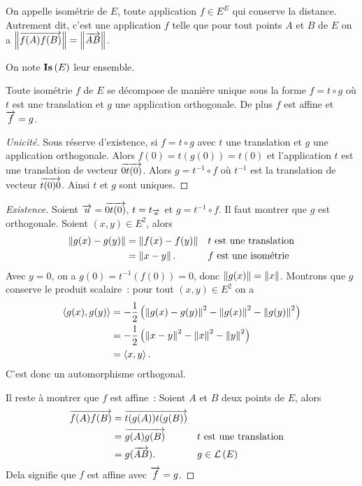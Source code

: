 \begin{defdef}
  On appelle isométrie de $E$, toute application $f \in E^E$ qui conserve la distance. Autrement dit, c'est une application $f$ telle que pour tout points $A$ et $B$ de $E$ on a $\left\lVert\overrightarrow{f(A)f(B)}\right\rVert=\left\lVert\overrightarrow{AB}\right\rVert$. 

  On note $\mathbf{Is}\left(E\right)$ leur ensemble.
\end{defdef}
%
\begin{theo}
\label{theo:isometrietransorth}
 Toute isométrie $f$ de $E$ se décompose de manière unique sous la forme $f=t \circ g$ où $t$ est une translation et $g$ une application orthogonale. De plus $f$ est affine et $\overrightarrow{f}=g$.
\end{theo}
\begin{proof}[Unicité]
  Sous réserve d'existence, si $f=t \circ g$ avec $t$ une translation et $g$ une application orthogonale. Alors $f(0)=t(g(0))=t(0)$ et l'application $t$ est une translation de vecteur $\overrightarrow{0t(0)}$. Alors $g=t^{-1} \circ f$ où $t^{-1}$ est la translation de vecteur $\overrightarrow{t(0)0}$. Ainsi $t$ et $g$ sont uniques.
\end{proof}
\begin{proof}[Existence]
  Soient $\overrightarrow{u} = \overrightarrow{0t(0)}$, $t=t_{\overrightarrow{u}}$ et $g=t^{-1}\circ f$. Il faut montrer que $g$ est orthogonale. Soient $(x,y) \in E^2$, alors
  \begin{align}
    \left\lVert g(x)-g(y)\right\rVert &= \left\lVert f(x)-f(y)\right\rVert && t \text{~est une translation} \\
    &=\left\lVert x-y\right\rVert. && f \text{~est une isométrie} \\
  \end{align}
  Avec $y=0$, on a $g(0) = t^{-1}(f(0))=0$, donc $\left\lVert g(x)\right\rVert=\left\lVert x\right\rVert$. Montrons que $g$ conserve le produit scalaire~: pour tout $(x,y) \in E^2$ on a
  \begin{align}
    \left\langle{g(x)},{g(y)}\right\rangle &= -\frac{1}{2} \left(\left\lVert g(x)-g(y)\right\rVert^2-\left\lVert g(x)\right\rVert^2-\left\lVert g(y)\right\rVert^2\right)\\
    &= -\frac{1}{2} \left(\left\lVert x-y\right\rVert^2-\left\lVert x\right\rVert^2-\left\lVert y\right\rVert^2\right)\\
    &=\left\langle{x},{y}\right\rangle.
  \end{align}
  C'est donc un automorphisme orthogonal. 

  Il reste à montrer que $f$ est affine~: Soient $A$ et $B$ deux points de $E$, alors
  \begin{align}
    \overrightarrow{f(A)f(B)} &= \overrightarrow{t(g(A))t(g(B))}\\
    &=\overrightarrow{g(A)g(B)} && t \text{~est une translation} \\
    &= g(\overrightarrow{AB}). && g \in \mathcal{L}\left(E\right)
  \end{align}
  Dela signifie que $f$ est affine avec $\overrightarrow{f}=g$.
\end{proof}
